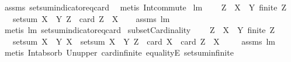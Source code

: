 \begin{isabellebody}
\isamarkupfalse%
\ assms\ setsum{\isacharunderscore}indicator{\isacharunderscore}eq{\isacharunderscore}card\ \isamarkupfalse%
\ {\isacharparenleft}metis\ Int{\isacharunderscore}commute{\isacharparenright}%
\endisatagproof
{\isafoldproof}%
%
\isadelimproof
\isanewline
%
\endisadelimproof
\isanewline
{}\isamarkupfalse%
\ lm{}{}{}{\isacharcolon}\ \isanewline
\ \ \ {\isachardoublequoteopen}Z\ {\isasymsubseteq}\ X\ {\isasymunion}\ Y{\isachardoublequoteclose}\ {\isachardoublequoteopen}finite\ Z{\isachardoublequoteclose}\ \isanewline
\ \ \ {\isachardoublequoteopen}setsum\ {\isacharparenleft}X\ {\isacharless}{\isacharbar}\ Y{\isacharparenright}\ Z\ {\isacharequal}\ card\ {\isacharparenleft}Z\ {\isasyminter}\ X{\isacharparenright}{\isachardoublequoteclose}\isanewline
%
\isadelimproof
\ \ %
\endisadelimproof
%
\isatagproof
{}\isamarkupfalse%
\ assms\ lm{}{}{}\ \isamarkupfalse%
\ {\isacharparenleft}metis\ lm{}{}{}\ setsum{\isacharunderscore}indicator{\isacharunderscore}eq{\isacharunderscore}card{\isacharparenright}%
\endisatagproof
{\isafoldproof}%
%
\isadelimproof
\isanewline
%
\endisadelimproof
\isanewline
{}\isamarkupfalse%
\ subsetCardinality{\isacharcolon}\ \isanewline
\ \ \ {\isachardoublequoteopen}Z\ {\isasymsubseteq}\ X\ {\isasymunion}\ Y{\isachardoublequoteclose}\ {\isachardoublequoteopen}finite\ Z{\isachardoublequoteclose}\ \isanewline
\ \ \ {\isachardoublequoteopen}{\isacharparenleft}setsum\ {\isacharparenleft}X\ {\isacharless}{\isacharbar}\ Y{\isacharparenright}\ X{\isacharparenright}\ {\isacharminus}\ {\isacharparenleft}setsum\ {\isacharparenleft}X\ {\isacharless}{\isacharbar}\ Y{\isacharparenright}\ Z{\isacharparenright}\ {\isacharequal}\ card\ X\ {\isacharminus}\ card\ {\isacharparenleft}Z\ {\isasyminter}\ X{\isacharparenright}{\isachardoublequoteclose}\ \isanewline
%
\isadelimproof
\ \ %
\endisadelimproof
%
\isatagproof
{}\isamarkupfalse%
\ assms\ lm{}{}{}\ \isamarkupfalse%
\ {\isacharparenleft}metis\ Int{\isacharunderscore}absorb{}\ Un{\isacharunderscore}upper{}\ card{\isacharunderscore}infinite\ equalityE\ setsum{\isachardot}infinite{\isacharparenright}%
\endisatagproof
{\isafoldproof}%
%
\isadelimproof
\isanewline
%
\endisadelimproof
\isanewline
{}\isamarkupfalse%

\end{isabellebody}
